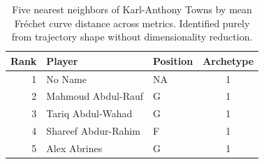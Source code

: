 \begin{table}[htbp]
  \centering\small
  \begin{tabular}{rllc}
    \toprule
    Rank & Player & Position & Archetype \\
    \midrule
    1 & No Name & NA & 1 \\
    2 & Mahmoud Abdul-Rauf & G & 1 \\
    3 & Tariq Abdul-Wahad & G & 1 \\
    4 & Shareef Abdur-Rahim & F & 1 \\
    5 & Alex Abrines & G & 1 \\
    \bottomrule
  \end{tabular}
  \caption{Five nearest neighbors of Karl-Anthony Towns by mean Fr\'{e}chet curve distance across metrics. Identified purely from trajectory shape without dimensionality reduction.}
\end{table}

